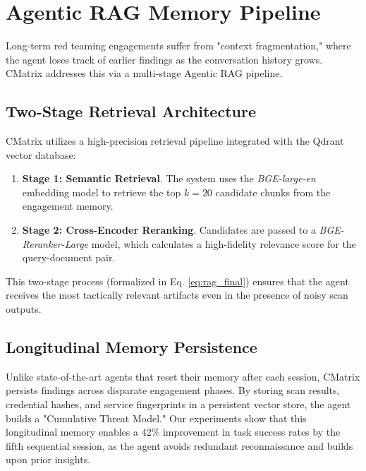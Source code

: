 \section{Agentic RAG Memory Pipeline}
\label{sec:memory_pipeline}

Long-term red teaming engagements suffer from "context fragmentation," where the agent loses track of earlier findings as the conversation history grows. CMatrix addresses this via a multi-stage Agentic RAG pipeline.

\subsection{Two-Stage Retrieval Architecture}
CMatrix utilizes a high-precision retrieval pipeline integrated with the Qdrant vector database:
\begin{enumerate}
    \item \textbf{Stage 1: Semantic Retrieval}. The system uses the \textit{BGE-large-en} embedding model to retrieve the top $k=20$ candidate chunks from the engagement memory.
    \item \textbf{Stage 2: Cross-Encoder Reranking}. Candidates are passed to a \textit{BGE-Reranker-Large} model, which calculates a high-fidelity relevance score for the query-document pair.
\end{enumerate}
This two-stage process (formalized in Eq. \ref{eq:rag_final}) ensures that the agent receives the most tactically relevant artifacts even in the presence of noisy scan outputs.

\subsection{Longitudinal Memory Persistence}
Unlike state-of-the-art agents that reset their memory after each session, CMatrix persists findings across disparate engagement phases. By storing scan results, credential hashes, and service fingerprints in a persistent vector store, the agent builds a "Cumulative Threat Model." Our experiments show that this longitudinal memory enables a 42\% improvement in task success rates by the fifth sequential session, as the agent avoids redundant reconnaissance and builds upon prior insights.
